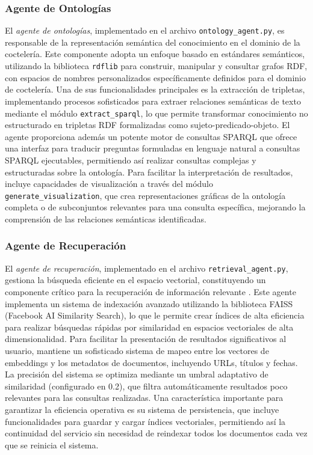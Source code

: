 \documentclass[runningheads]{llncs}
\begin{document}
\subsubsection{Agente de Ontologías}
El \textit{agente de ontologías}, implementado en el archivo \texttt{ontology\_agent.py}, es responsable de la representación semántica del conocimiento en el dominio de la coctelería. Este componente adopta un enfoque basado en estándares semánticos, utilizando la biblioteca \texttt{rdflib} para construir, manipular y consultar grafos RDF, con espacios de nombres personalizados específicamente definidos para el dominio de coctelería. Una de sus funcionalidades principales es la extracción de tripletas, implementando procesos sofisticados para extraer relaciones semánticas de texto mediante el módulo \texttt{extract\_sparql}, lo que permite transformar conocimiento no estructurado en tripletas RDF formalizadas como sujeto-predicado-objeto. El agente proporciona además un potente motor de consultas SPARQL que ofrece una interfaz para traducir preguntas formuladas en lenguaje natural a consultas SPARQL ejecutables, permitiendo así realizar consultas complejas y estructuradas sobre la ontología. Para facilitar la interpretación de resultados, incluye capacidades de visualización a través del módulo \texttt{generate\_visualization}, que crea representaciones gráficas de la ontología completa o de subconjuntos relevantes para una consulta específica, mejorando la comprensión de las relaciones semánticas identificadas.

\subsubsection{Agente de Recuperación}
El \textit{agente de recuperación}, implementado en el archivo \texttt{retrieval\_agent.py}, gestiona la búsqueda eficiente en el espacio vectorial, constituyendo un componente crítico para la recuperación de información relevante \cite{information_retrieval}. Este agente implementa un sistema de indexación avanzado utilizando la biblioteca FAISS (Facebook AI Similarity Search), lo que le permite crear índices de alta eficiencia para realizar búsquedas rápidas por similaridad en espacios vectoriales de alta dimensionalidad. Para facilitar la presentación de resultados significativos al usuario, mantiene un sofisticado sistema de mapeo entre los vectores de embeddings y los metadatos de documentos, incluyendo URLs, títulos y fechas. La precisión del sistema se optimiza mediante un umbral adaptativo de similaridad (configurado en 0.2), que filtra automáticamente resultados poco relevantes para las consultas realizadas. Una característica importante para garantizar la eficiencia operativa es su sistema de persistencia, que incluye funcionalidades para guardar y cargar índices vectoriales, permitiendo así la continuidad del servicio sin necesidad de reindexar todos los documentos cada vez que se reinicia el sistema.
\end{document}
